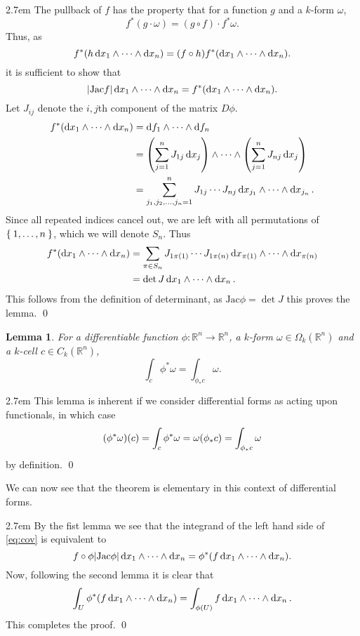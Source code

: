 \documentclass[10pt, oneside]{extarticle}
\newtheorem*{lemma}{Lemma}
\renewenvironment{proof}
{\vspace{.5cm}\begin{adjustwidth}{2.7em}{}\noindent{\bfseries Proof \quad}}
{\qed \end{adjustwidth}\vspace{1cm}}
\renewcommand{\to}[0]{\longrightarrow}
\newcommand{\jac}[0]{{\text{Jac}}}
\newcommand{\R}{{\mathbb{R}}}
\begin{document}
\begin{proof}
  The pullback of $f$ has the property that for a function $g$ and a $k$-form $\omega$,
    \[
      f^*(g \cdot \omega) = (g \circ f) \cdot f^* \omega.
    \]
  Thus, as 
  \[
     f^*(h \dd{x_1} \wedge \dots \wedge \dd{x_n}) = \qty(f \circ h) f^*\qty( \dd{x_1} \wedge \dots \wedge \dd{x_n}).
  \]
  it is sufficient to show that 
  \[
    |\jac f|  \dd{x_1} \wedge \dots \wedge \dd{x_n} = f^*\qty( \dd{x_1} \wedge \dots \wedge \dd{x_n}).
  \]
  Let $J_{ij}$ denote the $i,j$th component of the matrix $D\phi$. 
  \begin{align*}
    f^*\qty( \dd{x_1} \wedge \dots \wedge \dd{x_n}) &= \dd{f_1} \wedge \dots \wedge \dd{f_n} \\
    &= \qty( \sum_{j = 1}^n J_{1j} \dd{x_j} ) \wedge \dots \wedge \qty( \sum_{j = 1}^n J_{nj} \dd{x_j} ) \\
    &= \sum_{j_1, j_2, \dots, j_n = 1}^n J_{1j} \cdots J_{nj} \dd{x_{j_1}} \wedge \dots \wedge \dd{x_{j_n}}.
  \end{align*}
  Since all repeated indices cancel out, we are left with all permutations of $\Set{1, \dots, n}$, which we will denote $S_n$. Thus 
  \begin{align*}
   f^*\qty( \dd{x_1} \wedge \dots \wedge \dd{x_n}) 
   &= \sum_{\pi \in S_n} J_{1\pi(1)} \cdots J_{1\pi(n)} \dd{x_{\pi(1)}} \wedge \dots \wedge \dd{x_{\pi(n)}} \\
   &= \det J  \dd{x_1} \wedge \dots \wedge \dd{x_n}.
  \end{align*}
  This follows from the definition of determinant, as $\jac \phi = \det J$ this proves the lemma. 
\end{proof}

\begin{lemma}
  For a differentiable function $\phi : \R^n \to \R^n$, a $k$-form $\omega \in \Omega_k(\R^n)$ and a $k$-cell $c \in C_k(\R^n)$,
  \[
    \int_c \phi^*\omega  = \int_{\phi_* c} \omega.
  \]  
\end{lemma}

\begin{proof}
    This lemma is inherent if we consider differential forms as acting upon functionals, in which case 
    \[
      \qty(\phi^*\omega)(c) = \int_c \phi^* \omega = \omega(\phi_*c) = \int_{\phi_* c} \omega
    \]
    by definition.
\end{proof}

We can now see that the theorem is elementary in this context of differential forms.

\begin{proof}
  By the fist lemma we see that the integrand of the left hand side of \eqref{eq:cov} is equivalent to 
  \[
      f \circ \phi \abs{\jac\phi} \dd{x_1} \wedge \dots \wedge \dd{x_n}
      = \phi^* \qty( f\dd{x_1} \wedge \dots \wedge \dd{x_n}).
  \]
  Now, following the second lemma it is clear that 
  \[
    \int_U  \phi^* \qty( f\dd{x_1} \wedge \dots \wedge \dd{x_n}) = \int_{\phi(U)} f\dd{x_1} \wedge \dots \wedge \dd{x_n}.
  \]
  This completes the proof.
\end{proof}
\end{document}
